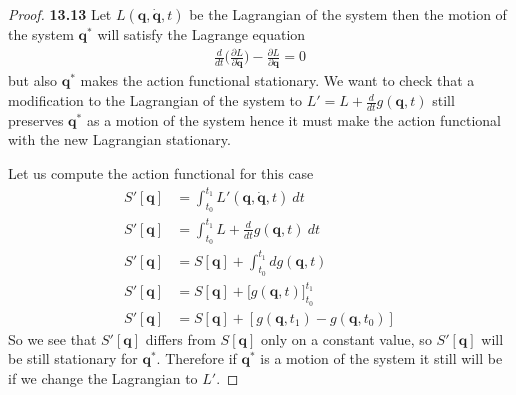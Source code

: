 \documentclass[11pt]{article}
\theoremstyle{definition}
\begin{document}
\cleardoublepage
\begin{proof}{\textbf{13.13}}
    Let $L(\bm{q}, \bm{\dot{q}}, t)$ be the Lagrangian of the system then the
    motion of the system $\bm{q}^*$ will satisfy the Lagrange equation 
    \begin{align*}
        \frac{d}{dt}\bigg(\frac{\partial L}{\partial \bm{\dot{q}}}\bigg)
        - \frac{\partial L}{\partial \bm{q}} = 0
    \end{align*}
    but also $\bm{q}^*$ makes the action functional stationary.
    We want to check that a modification to the Lagrangian of the system to
    $L' = L + \frac{d}{dt}g(\bm{q},t)$ still preserves $\bm{q}^*$ as a motion
    of the system hence it must make the action functional with the
    new Lagrangian stationary.
    
    Let us compute the action functional for this case
    \begin{align*}
        S'[\bm{q}] &= \int_{t_0}^{t_1} L'(\bm{q}, \bm{\dot{q}}, t)~dt\\
        S'[\bm{q}] &= \int_{t_0}^{t_1} L + \frac{d}{dt}g(\bm{q},t)~dt\\
        S'[\bm{q}] &= S[\bm{q}] + \int_{t_0}^{t_1} dg(\bm{q},t)\\
        S'[\bm{q}] &= S[\bm{q}] + \bigg[g(\bm{q},t)\bigg]_{t_0}^{t_1}\\
        S'[\bm{q}] &= S[\bm{q}] + [g(\bm{q},t_1) - g(\bm{q},t_0)]
    \end{align*}
    So we see that $S'[\bm{q}]$ differs from $S[\bm{q}]$ only on a constant
    value, so $S'[\bm{q}]$ will be still stationary for $\bm{q}^*$.
    Therefore if $\bm{q}^*$ is a motion of the system it still will be if
    we change the Lagrangian to $L'$.    
\end{proof}
\cleardoublepage
\end{document}
